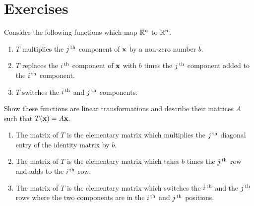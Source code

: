 \section*{Exercises}

\begin{ex} \label{exer-linear-transf}
  Consider the following functions which map $\mathbb{R}^{n}$ to $\mathbb{R}^{n}$.

  \begin{enumerate}
  \item $T$ multiplies the $j^{\,\rm th}$ component of $\mbox{\bf x}$ by a non-zero
    number $b$.

  \item $T$ replaces the $i^{\,\rm th}$ component of $\mbox{\bf x}$ with $b$ times the
    $j^{\,\rm th}$ component added to the $i^{\,\rm th}$ component.

  \item $T$ switches the $i^{\,\rm th}$ and $j^{\,\rm th}$ components.
  \end{enumerate}

  Show these functions are linear transformations and describe their matrices $A$ such that $T(\mbox{\bf x}) = A\mbox{\bf x}$.
  \begin{sol}
    \begin{enumerate}
    \item The matrix of $T$ is the elementary matrix which multiplies
      the $j^{\,\rm th}$ diagonal entry of the identity matrix by $b$.
    \item The matrix of $T$ is the
      elementary matrix which takes $b$ times the $j^{\,\rm th}$ row and adds to the $%
      i\th$ row.
    \item The matrix of $T$ is the elementary matrix which switches the $%
      i\th$ and the $j^{\,\rm th}$ rows where the two components are in the $i^{\,\rm th}$
      and $j^{\,\rm th}$ positions.
    \end{enumerate}
  \end{sol}
\end{ex}

